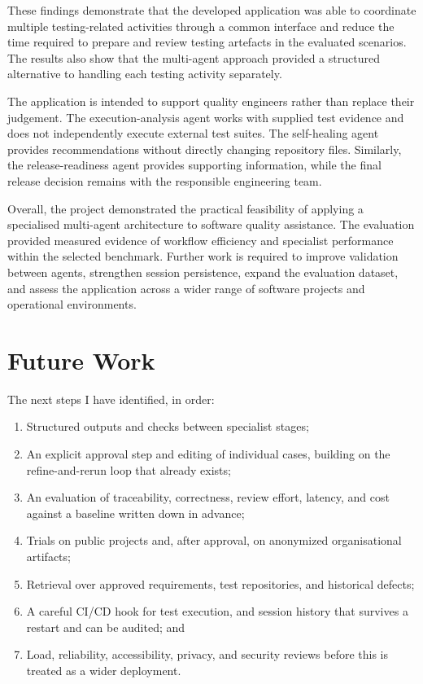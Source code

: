 These findings demonstrate that the developed application was able to coordinate multiple testing-related activities through a common interface and reduce the time required to prepare and review testing artefacts in the evaluated scenarios. The results also show that the multi-agent approach provided a structured alternative to handling each testing activity separately.

The application is intended to support quality engineers rather than replace their judgement. The execution-analysis agent works with supplied test evidence and does not independently execute external test suites. The self-healing agent provides recommendations without directly changing repository files. Similarly, the release-readiness agent provides supporting information, while the final release decision remains with the responsible engineering team.

Overall, the project demonstrated the practical feasibility of applying a specialised multi-agent architecture to software quality assistance. The evaluation provided measured evidence of workflow efficiency and specialist performance within the selected benchmark. Further work is required to improve validation between agents, strengthen session persistence, expand the evaluation dataset, and assess the application across a wider range of software projects and operational environments.

\clearpage

\section{Future Work}
The next steps I have identified, in order:
\begin{enumerate}
  \item Structured outputs and checks between specialist stages;
  \item An explicit approval step and editing of individual cases, building on the refine-and-rerun loop that already exists;
  \item An evaluation of traceability, correctness, review effort, latency, and cost against a baseline written down in advance;
  \item Trials on public projects and, after approval, on anonymized organisational artifacts;
  \item Retrieval over approved requirements, test repositories, and historical defects;
  \item A careful CI/CD hook for test execution, and session history that survives a restart and can be audited; and
  \item Load, reliability, accessibility, privacy, and security reviews before this is treated as a wider deployment.
\end{enumerate}

